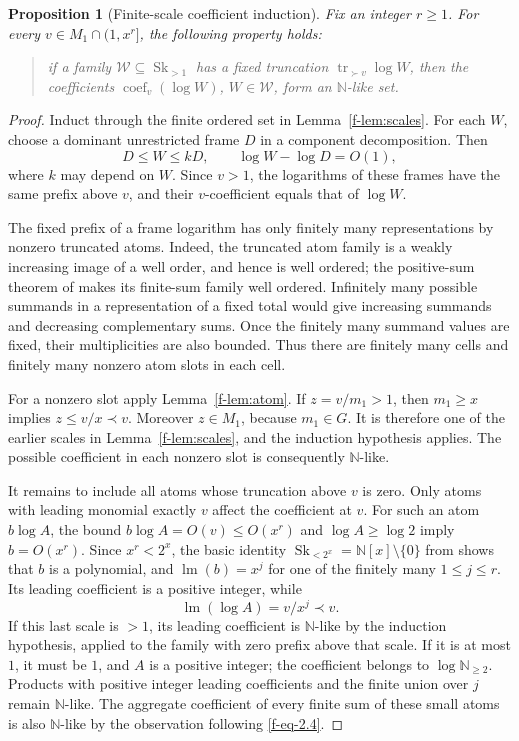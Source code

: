 \documentclass[11pt]{article}
\newtheorem{proposition}[theorem]{Proposition}
\theoremstyle{definition}
\theoremstyle{remark}
\newcommand{\Sk}{\operatorname{Sk}}
\newcommand{\N}{\mathbb N}
\newcommand{\tr}{\operatorname{tr}}
\newcommand{\lm}{\operatorname{lm}}
\DeclareMathOperator{\coef}{coef}
\newcommand{\calW}{\mathcal W}
\numberwithin{equation}{section}
\begin{document}
\begin{proposition}[Finite-scale coefficient induction]
\label{f-prop:coefficients}
Fix an integer \(r\ge1\).  For every \(v\in M_1\cap(1,x^r]\), the following
property holds:
\begin{quote}
if a family \(\calW\subseteq\Sk_{>1}\) has a fixed truncation
\(\tr_{\succ v}\log W\), then the coefficients
\(\coef_v(\log W)\), \(W\in\calW\), form an \(\N\)-like set.
\end{quote}
\end{proposition}
\begin{proof}
Induct through the finite ordered set in Lemma~\ref{f-lem:scales}.
For each \(W\), choose a dominant unrestricted frame \(D\) in a
component decomposition.  Then
\begin{equation}
 D\le W\le kD,\qquad \log W-\log D=O(1),
 \label{f-eq-3.6}
\end{equation}
where \(k\) may depend on \(W\).
Since \(v>1\), the logarithms of these frames have the same prefix
above \(v\), and their \(v\)-coefficient equals that of \(\log W\).

The fixed prefix of a frame logarithm has only finitely many
representations by nonzero truncated atoms.  Indeed, the truncated
atom family is a weakly increasing image of a well order, and hence
is well ordered; the positive-sum theorem of \cite[\S4]{BM} makes
its finite-sum family well ordered.  Infinitely many possible
summands in a representation of a fixed total would give increasing
summands and decreasing complementary sums.  Once the finitely many
summand values are fixed, their multiplicities are also bounded.
Thus there are finitely many cells and finitely many nonzero atom
slots in each cell.

For a nonzero slot apply Lemma~\ref{f-lem:atom}.
If \(z=v/m_1>1\), then \(m_1\ge x\) implies \(z\le v/x\prec v\).
Moreover \(z\in M_1\), because \(m_1\in G\).
It is therefore one of the earlier scales in
Lemma~\ref{f-lem:scales}, and the induction hypothesis applies.
The possible coefficient in each nonzero slot is consequently
\(\N\)-like.

It remains to include all atoms whose truncation above \(v\) is
zero.  Only atoms with leading monomial exactly \(v\) affect the
coefficient at \(v\).
For such an atom \(b\log A\), the bound
\(b\log A=O(v)\le O(x^r)\) and \(\log A\ge\log2\) imply
\(b=O(x^r)\).  Since \(x^r<2^x\), the basic identity
\(\Sk_{<2^x}=\N[x]\setminus\{0\}\) from \cite{BM} shows that
\(b\) is a polynomial, and
\(\lm(b)=x^j\) for one of the finitely many \(1\le j\le r\).
Its leading coefficient is a positive integer, while
\[
 \lm(\log A)=v/x^j\prec v.
\]
If this last scale is \(>1\), its leading coefficient is
\(\N\)-like by the induction hypothesis, applied to the family with
zero prefix above that scale.  If it is at most \(1\), it must be
\(1\), and \(A\) is a positive integer; the coefficient belongs to
\(\log\N_{\ge2}\).  Products with positive integer leading
coefficients and the finite union over \(j\) remain \(\N\)-like.
The aggregate coefficient of every finite sum of these small atoms
is also \(\N\)-like by the observation following \eqref{f-eq-2.4}.


\end{proof}
\end{document}
